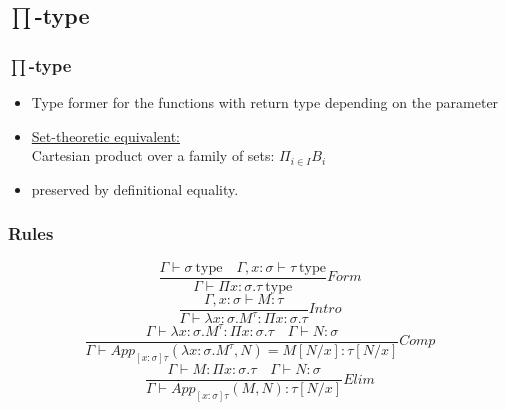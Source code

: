 \documentclass[aspectratio=169]{beamer}
\newcommand{\typ}{\ \mathrm{type}}
\newcommand{\app}[2]{App_{[x:\sigma]\tau}(#1, #2)}
\newcommand{\C}{Comp}
\newcommand{\Intro}{Intro}
\newcommand{\F}{Form}
\newcommand{\E}{Elim}
\begin{document}
    \subsection{$\prod$-type}
    \begin{frame}
        \frametitle{$\prod$-type}
        \begin{itemize}
            \item Type former for the functions with return type depending on the parameter
            \item \underline{Set-theoretic equivalent:}\\
            Cartesian product over a family of sets: $\Pi_{i\in I}B_i$
            \item preserved by definitional equality.
        \end{itemize}
    \end{frame}
    \begin{frame}
        \frametitle{Rules}
        $$\frac{\Gamma \vdash \sigma \typ \quad \Gamma,x:\sigma\vdash \tau \typ}{\Gamma \vdash \Pi x:\sigma.\tau \typ}\F$$
        \vspace{10pt}
        $$\frac{\Gamma, x:\sigma \vdash M : \tau}{\Gamma \vdash \lambda x:\sigma.M^\tau : \Pi x:\sigma.\tau}\Intro$$
        \vspace{10pt}
        $$\frac{\Gamma \vdash \lambda x:\sigma.M^\tau:\Pi x:\sigma.\tau \quad \Gamma \vdash N:\sigma}{\Gamma \vdash \app{\lambda x:\sigma.M^{\tau}}{N} = M[N/x]:\tau[N/x]}\C$$
        \vspace{10pt}
        $$\frac{\Gamma \vdash M : \Pi x: \sigma . \tau \quad \Gamma \vdash N: \sigma}{\Gamma \vdash \app{M}{N}: \tau[N/x]}\E$$
    \end{frame}
\end{document}
